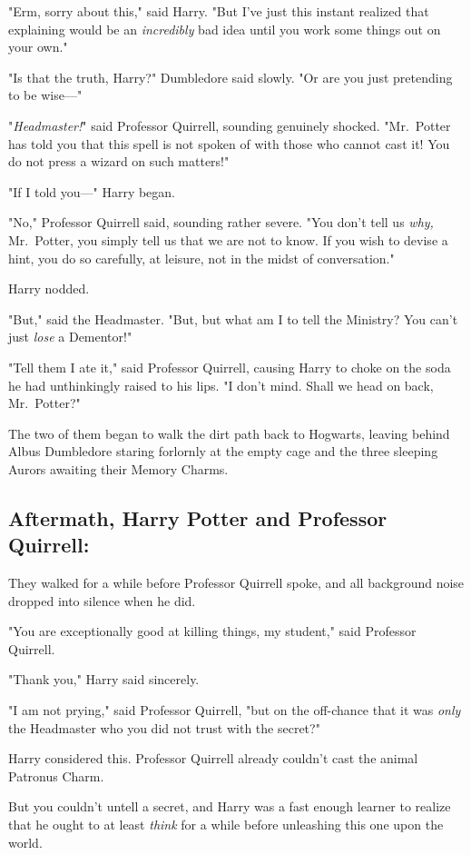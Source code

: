 "Erm, sorry about this," said Harry. "But I've just this instant realized that
explaining would be an \emph{incredibly} bad idea until you work some things
out on your own."

"Is that the truth, Harry?" Dumbledore said slowly. "Or are you just pretending
to be wise\mbox{---}"

"\emph{Headmaster!}" said Professor Quirrell, sounding genuinely shocked.
"Mr.~Potter has told you that this spell is not spoken of with those who cannot
cast it! You do not press a wizard on such matters!"

"If I told you\mbox{---}" Harry began.

"No," Professor Quirrell said, sounding rather severe. "You don't tell us
\emph{why,} Mr.~Potter, you simply tell us that we are not to know. If you wish
to devise a hint, you do so carefully, at leisure, not in the midst of
conversation."

Harry nodded.

"But," said the Headmaster. "But, but what am I to tell the Ministry? You can't
just \emph{lose} a Dementor!"

"Tell them I ate it," said Professor Quirrell, causing Harry to choke on the
soda he had unthinkingly raised to his lips. "I don't mind. Shall we head on
back, Mr.~Potter?"

The two of them began to walk the dirt path back to Hogwarts, leaving behind
Albus Dumbledore staring forlornly at the empty cage and the three sleeping
Aurors awaiting their Memory Charms.
\sbreak
\subsection{Aftermath, Harry Potter and Professor Quirrell:}

They walked for a while before Professor Quirrell spoke, and all background
noise dropped into silence when he did.

"You are exceptionally good at killing things, my student," said Professor
Quirrell.

"Thank you," Harry said sincerely.

"I am not prying," said Professor Quirrell, "but on the off-chance that it was
\emph{only} the Headmaster who you did not trust with the secret{\el}?"

Harry considered this. Professor Quirrell already couldn't cast the animal
Patronus Charm.

But you couldn't untell a secret, and Harry was a fast enough learner to
realize that he ought to at least \emph{think} for a while before unleashing
this one upon the world.

